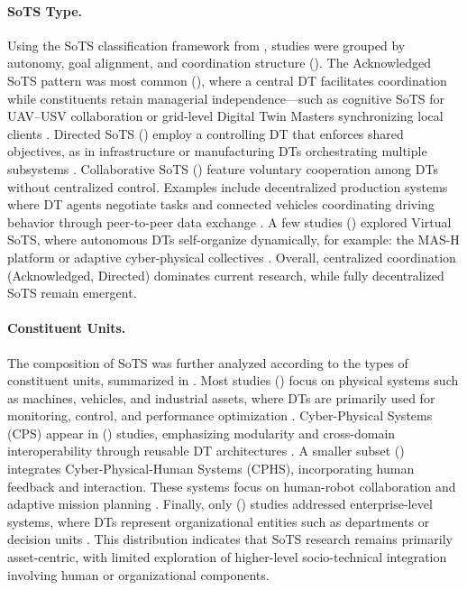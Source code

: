 \paragraph{SoTS Type.}\label{para:lt-rq2-sots-type}
Using the SoTS classification framework from , studies were grouped by autonomy, goal alignment, and coordination structure (). The Acknowledged SoTS pattern was most common (), where a central DT facilitates coordination while constituents retain managerial independence—such as cognitive SoTS for UAV–USV collaboration \cite{li2022cognitive} or grid-level Digital Twin Masters synchronizing local clients \cite{monsalve2021novel}. Directed SoTS () employ a controlling DT that enforces shared objectives, as in infrastructure or manufacturing DTs orchestrating multiple subsystems \cite{reiche2021digital, li2024comprehensive}. Collaborative SoTS () feature voluntary cooperation among DTs without centralized control. Examples include decentralized production systems where DT agents negotiate tasks \cite{vogel-heuser2021approach} and connected vehicles coordinating driving behavior through peer-to-peer data exchange \cite{chen2018digital}. A few studies () explored Virtual SoTS, where autonomous DTs self-organize dynamically, for example: the MAS-H platform \cite{pickering2023towards} or adaptive cyber-physical collectives \cite{esterle2021digital}. Overall, centralized coordination (Acknowledged, Directed) dominates current research, while fully decentralized SoTS remain emergent.




\paragraph{Constituent Units.}\label{para:lt-rq2-constituents}
The composition of SoTS was further analyzed according to the types of constituent units, summarized in . Most studies () focus on physical systems such as machines, vehicles, and industrial assets, where DTs are primarily used for monitoring, control, and performance optimization \cite{reiche2021digital, kruger2022towards}. Cyber-Physical Systems (CPS) appear in () studies, emphasizing modularity and cross-domain interoperability through reusable DT architectures \cite{marah2023architecture, mahoro2023articulating}. A smaller subset () integrates Cyber-Physical-Human Systems (CPHS), incorporating human feedback and interaction. These systems focus on human-robot collaboration and adaptive mission planning \cite{savur2019hrc-sos, folds2019digital}. Finally, only () studies addressed enterprise-level systems, where DTs represent organizational entities such as departments or decision units \cite{kulkarni2019towards, maheshwari2022digital}. This distribution indicates that SoTS research remains primarily asset-centric, with limited exploration of higher-level socio-technical integration involving human or organizational components.


